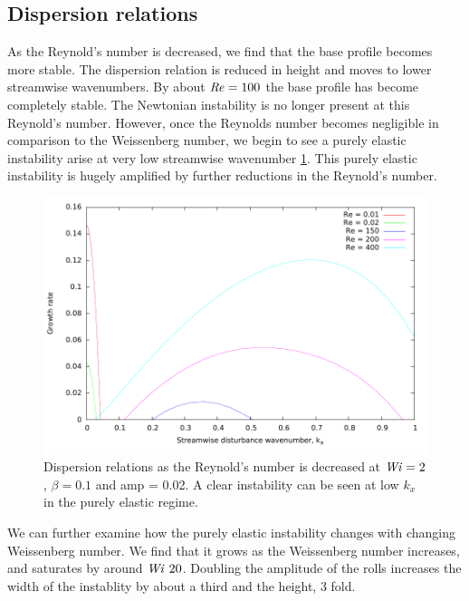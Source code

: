 \documentclass{jfm}
\newcommand\Wi{\mbox{\textit{Wi}}}
\newcommand\Rey{\mbox{\textit{Re}}}  %
\begin{document}
\subsection{Dispersion relations}

As the Reynold's number is decreased, we find that the base profile becomes more stable. The dispersion relation is reduced in height and moves to lower streamwise wavenumbers. By about $\Rey = 100$ the base profile has become completely stable. The Newtonian instability is no longer present at this Reynold's number. However, once the Reynolds number becomes negligible in comparison to the Weissenberg number, we begin to see a purely elastic instability arise at very low streamwise wavenumber \ref{fig:dispersions_varyRe}. This purely elastic instability is hugely amplified by further reductions in the Reynold's number.

\begin{figure}
    \centering
    \includegraphics[width=\textwidth]{./figures/dispersions_varyRe}
    \caption{Dispersion relations as the Reynold's number is decreased at $\Wi = 2$, $\beta=0.1$ and amp = 0.02. A clear instability can be seen at low $k_{x}$ in the purely elastic regime.}
    \label{fig:dispersions_varyRe}
\end{figure}

We can further examine how the purely elastic instability changes with changing Weissenberg number. We find that it grows as the Weissenberg number increases, and saturates by around $\Wi ~ 20$. Doubling the amplitude of the rolls increases the width of the instablity by about a third and the height, 3 fold.  
\end{document}

